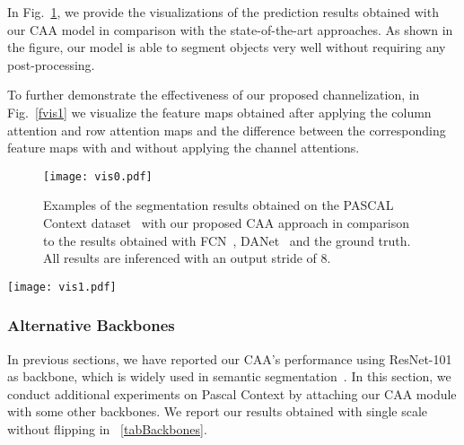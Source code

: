\documentclass[journal]{IEEEtran}
\begin{document}
In Fig.~\ref{fvis0}, we provide the visualizations of the prediction results obtained with our CAA model in comparison with the state-of-the-art approaches. 
As shown in the figure, our model is able to segment objects very well without requiring any post-processing.

To further demonstrate the effectiveness of our proposed channelization, in Fig.~\ref{fvis1} we visualize the feature maps obtained after applying the column attention and row attention maps and the difference between the corresponding feature maps with and without applying the channel attentions.\\

\begin{figure}[t]
	\centering
\texttt{[image: vis0.pdf]}
	\caption{Examples of the segmentation results obtained on the PASCAL Context dataset~\cite{cPascalContext} with our proposed CAA approach in comparison to the results obtained with FCN~\cite{cFCN}, DANet~\cite{cDualAttention} and the ground truth. All results are inferenced with an output stride of 8. }
	\label{fvis0}
\end{figure}

\begin{figure*}[t]
	\centering
	\texttt{[image: vis1.pdf]}
	\caption{Visualization of the feature maps (, ,  and ) on PASCAL Context~\cite{cPascalContext} (top two rows) and Cityscapes~\cite{cCityScapes} (bottom two rows). 
		For each input image, we list the feature maps obtained after applying the column attention map and row attention map, the difference between the corresponding feature maps with and without applying the channel attentions, as well as our prediction and the ground truth segmentation, respectively
		For more details, please refer to Sect.~\ref{fdetail}.} \label{fvis1}
\end{figure*}


\subsubsection{Alternative Backbones}
In previous sections, we have reported our CAA's performance using ResNet-101~\cite{cResnet} as backbone, which is widely used in semantic segmentation~\cite{cDeepLabV3Plus, cDualAttention, cCCNet, cEMANet, cDenseASPP, cOCR, cENCNet, cCFNet, cPSPNet, cSANet, cANNN}. 
In this section, we conduct additional experiments on Pascal Context by attaching our CAA module with some other backbones. 
We report our results obtained with single scale without flipping in~\tablename{ \ref{tabBackbones}}.\\
\end{document}
